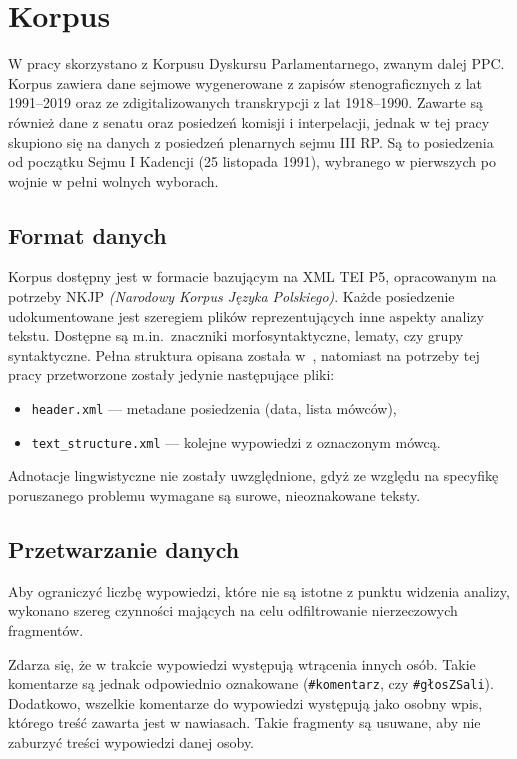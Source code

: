 
\chapter{Korpus}
  W pracy skorzystano z Korpusu Dyskursu Parlamentarnego\cite{PPC}, zwanym dalej PPC\@. 
  Korpus zawiera dane sejmowe wygenerowane z zapisów stenograficznych z lat 1991--2019
    oraz ze zdigitalizowanych transkrypcji z lat 1918--1990.
  Zawarte są również dane z senatu oraz posiedzeń komisji i interpelacji,
    jednak w tej pracy skupiono się na danych z posiedzeń plenarnych sejmu III RP\@.
  Są to posiedzenia od początku Sejmu I Kadencji (25 listopada 1991), wybranego w pierwszych po wojnie w pełni wolnych wyborach.

\section{Format danych}
  Korpus dostępny jest w formacie bazującym na XML TEI P5, opracowanym na potrzeby NKJP \textit{(Narodowy Korpus Języka Polskiego)}.
  Każde posiedzenie udokumentowane jest szeregiem plików reprezentujących inne aspekty analizy tekstu.
  Dostępne są m.in.\ znaczniki morfosyntaktyczne, lematy, czy grupy syntaktyczne.
  Pełna struktura opisana została w~\cite{PSC},
    natomiast na potrzeby tej pracy przetworzone zostały jedynie następujące pliki:
  \begin{itemize}
    \item \verb|header.xml| --- metadane posiedzenia (data, lista mówców),
    \item \verb|text_structure.xml| --- kolejne wypowiedzi z oznaczonym mówcą.
  \end{itemize}
  Adnotacje lingwistyczne nie zostały uwzględnione,
    gdyż ze względu na specyfikę poruszanego problemu wymagane są surowe, nieoznakowane teksty.
  
\section{Przetwarzanie danych}
  Aby ograniczyć liczbę wypowiedzi, które nie są istotne z punktu widzenia analizy,
    wykonano szereg czynności mających na celu odfiltrowanie nierzeczowych fragmentów.
  
  Zdarza się, że w trakcie wypowiedzi występują wtrącenia innych osób.
  Takie komentarze są jednak odpowiednio oznakowane (\verb|#komentarz|, czy \verb|#głosZSali|).
  Dodatkowo, wszelkie komentarze do wypowiedzi występują jako osobny wpis, którego treść zawarta jest w nawiasach.
  Takie fragmenty są usuwane, aby nie zaburzyć treści wypowiedzi danej osoby.

